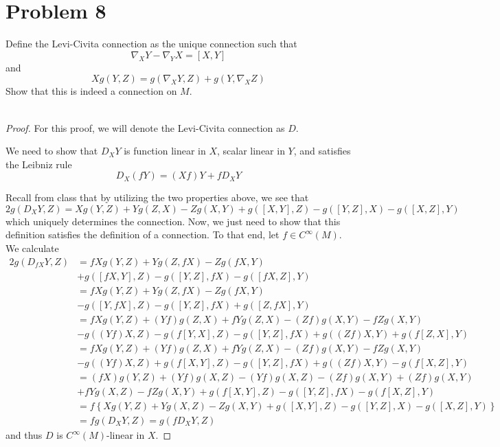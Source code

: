 \documentclass[fontsize=11pt]{scrartcl} %
\numberwithin{equation}{section} %
\numberwithin{figure}{section} %
\numberwithin{table}{section} %
\begin{document}
\section*{Problem 8}
Define the Levi-Civita connection as the unique connection such that
\[
    \nabla_X Y-\nabla_YX = [X,Y]
\]
and
\[
    Xg(Y,Z) = g(\nabla_XY,Z) + g(Y,\nabla_XZ)
\]
Show that this is indeed a connection on $M$.
\\
\\
\begin{proof}
    For this proof, we will denote the Levi-Civita connection as $D$.

    We need to show that $D_XY$ is function linear in $X$, scalar linear in
    $Y$, and satisfies the Leibniz rule
    \[
        D_X(fY) = (Xf)Y + fD_XY
    \]

    Recall from class that by utilizing the two properties above, we see that
    \[
        2g(D_XY,Z) = Xg(Y,Z) + Yg(Z,X) - Zg(X,Y) + g([X,Y],Z) -g([Y,Z],X) -
        g([X,Z],Y)
    \]
    which uniquely determines the connection. Now, we just need to show that
    this definition satisfies the definition of a connection. To that end, let
    $f\in C^{\infty}(M)$. We calculate
    \[
\begin{aligned}
    2g(D_{fX}Y,Z) &= fXg(Y,Z) + Yg(Z,fX) - Zg(fX,Y)\\
        &+ g([fX,Y],Z) -g([Y,Z],fX) - g([fX,Z],Y)\\
        &=fXg(Y,Z) + Yg(Z,fX) - Zg(fX,Y)\\
        &- g([Y,fX],Z) - g([Y,Z],fX) + g([Z,fX],Y)\\
        &=fXg(Y,Z) + (Yf)g(Z,X) + fYg(Z,X) - (Zf)g(X,Y) - fZg(X,Y)\\
        &- g((Yf)X,Z) - g(f[Y,X],Z) - g([Y,Z],fX) + g((Zf)X,Y) + g(f[Z,X],Y)\\
        &=fXg(Y,Z)  + (Yf)g(Z,X) + fYg(Z,X) - (Zf)g(X,Y) - fZg(X,Y)\\
        &- g((Yf)X,Z) + g(f[X,Y],Z) - g([Y,Z],fX) + g((Zf)X,Y) - g(f[X,Z],Y)\\
        &=(fX)g(Y,Z) + (Yf)g(X,Z) - (Yf)g(X,Z) - (Zf)g(X,Y) + (Zf)g(X,Y)\\
        &+ fYg(X,Z) -fZg(X,Y) + g(f[X,Y],Z) -g([Y,Z],fX) -g(f[X,Z],Y)\\
        &= f\left\{ Xg(Y,Z) + Yg(X,Z) -Zg(X,Y) + g([X,Y],Z) - g([Y,Z],X) -
        g([X,Z],Y) \right\}\\
        &=fg(D_XY,Z) = g(fD_XY,Z)
\end{aligned}
    \]
    and thus $D$ is $C^{\infty}(M)$-linear in $X$.


\end{proof}
\end{document}
